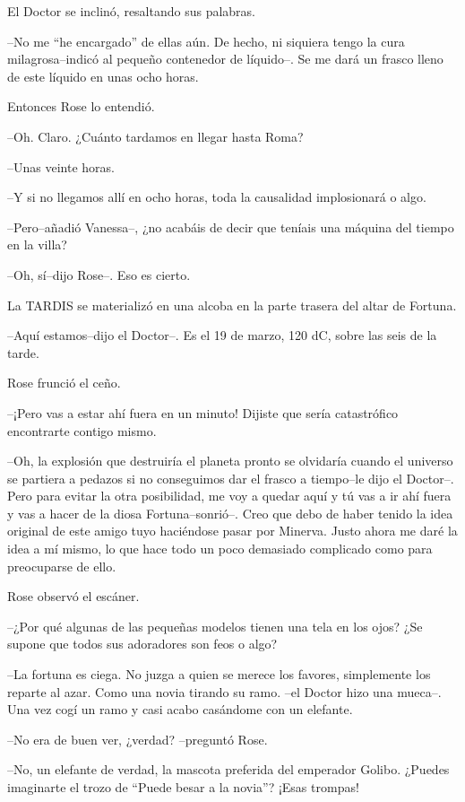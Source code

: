 El Doctor se inclinó, resaltando sus palabras.

--No me ``he encargado'' de ellas aún. De hecho, ni siquiera tengo la
cura milagrosa--indicó al pequeño contenedor de líquido--. Se me dará un
frasco lleno de este líquido en unas ocho horas.

Entonces Rose lo entendió.

--Oh. Claro. ¿Cuánto tardamos en llegar hasta Roma?

--Unas veinte horas.

--Y si no llegamos allí en ocho horas, toda la causalidad implosionará o
algo.

--Pero--añadió Vanessa--, ¿no acabáis de decir que teníais una máquina
del tiempo en la villa?

--Oh, sí--dijo Rose--. Eso es cierto.

La TARDIS se materializó en una alcoba en la parte trasera del altar de
Fortuna.

--Aquí estamos--dijo el Doctor--. Es el 19 de marzo, 120 dC, sobre las
seis de la tarde.

Rose frunció el ceño.

--¡Pero vas a estar ahí fuera en un minuto! Dijiste que sería
catastrófico encontrarte contigo mismo.

--Oh, la explosión que destruiría el planeta pronto se olvidaría cuando
el universo se partiera a pedazos si no conseguimos dar el frasco a
tiempo--le dijo el Doctor--. Pero para evitar la otra posibilidad, me
voy a quedar aquí y tú vas a ir ahí fuera y vas a hacer de la diosa
Fortuna--sonrió--. Creo que debo de haber tenido la idea original de
este amigo tuyo haciéndose pasar por Minerva. Justo ahora me daré la
idea a mí mismo, lo que hace todo un poco demasiado complicado como para
preocuparse de ello.

Rose observó el escáner.

--¿Por qué algunas de las pequeñas modelos tienen una tela en los ojos?
¿Se supone que todos sus adoradores son feos o algo?

--La fortuna es ciega. No juzga a quien se merece los favores,
simplemente los reparte al azar. Como una novia tirando su ramo. --el
Doctor hizo una mueca--. Una vez cogí un ramo y casi acabo casándome con
un elefante.

--No era de buen ver, ¿verdad? --preguntó Rose.

--No, un elefante de verdad, la mascota preferida del emperador Golibo.
¿Puedes imaginarte el trozo de ``Puede besar a la novia''? ¡Esas
trompas!

